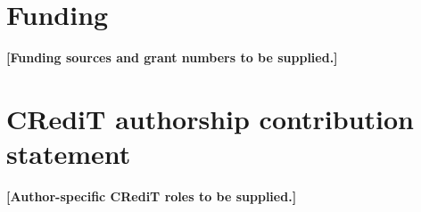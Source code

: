 \documentclass[preprint,12pt]{elsarticle}
\begin{document}
\section*{Funding}
\textbf{[Funding sources and grant numbers to be supplied.]}

\section*{CRediT authorship contribution statement}
\textbf{[Author-specific CRediT roles to be supplied.]}

\appendix


\clearpage




\end{document}
